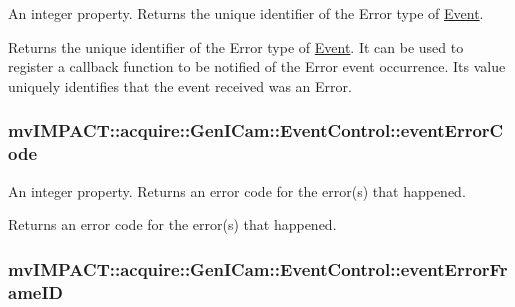 An integer property. Returns the unique identifier of the Error type of \hyperlink{classmv_i_m_p_a_c_t_1_1acquire_1_1_event}{Event}. 

Returns the unique identifier of the Error type of \hyperlink{classmv_i_m_p_a_c_t_1_1acquire_1_1_event}{Event}. It can be used to register a callback function to be notified of the Error event occurrence. Its value uniquely identifies that the event received was an Error. \hypertarget{classmv_i_m_p_a_c_t_1_1acquire_1_1_gen_i_cam_1_1_event_control_aafc14b4ed8b2aab215476207a4e28bc5}{
\subsubsection[{event\+Error\+Code}]{ mv\+I\+M\+P\+A\+C\+T\+::acquire\+::\+Gen\+I\+Cam\+::\+Event\+Control\+::event\+Error\+Code}}\label{classmv_i_m_p_a_c_t_1_1acquire_1_1_gen_i_cam_1_1_event_control_aafc14b4ed8b2aab215476207a4e28bc5}


An integer property. Returns an error code for the error(s) that happened. 

Returns an error code for the error(s) that happened. \hypertarget{classmv_i_m_p_a_c_t_1_1acquire_1_1_gen_i_cam_1_1_event_control_a1787e2a213e7cf1faa92ff71ed8eb7cb}{
\subsubsection[{event\+Error\+Frame\+I\+D}]{ mv\+I\+M\+P\+A\+C\+T\+::acquire\+::\+Gen\+I\+Cam\+::\+Event\+Control\+::event\+Error\+Frame\+I\+D}}\label{classmv_i_m_p_a_c_t_1_1acquire_1_1_gen_i_cam_1_1_event_control_a1787e2a213e7cf1faa92ff71ed8eb7cb}


